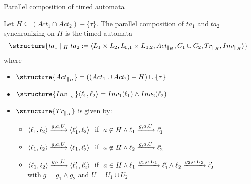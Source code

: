 \documentclass[aspectratio=169]{beamer}
\begin{document}
\begin{slide}{Parallel composition of timed automata}
\small

Let $H \subseteq (Act_1 \cap Act_2) - \{\tau\}$. The parallel composition of $ta_1$ and  $ta_2$ synchronizing on $H$
is the timed automata
\begin{equation*}
\structure{ta_1 \parallel_H ta_2 := \pair{L_1 \times L_2, L_{0,1} \times L_{0,2}, Act_{\parallel_H}, C_1 \cup C_2, Tr_{\parallel_H}, Inv_{\parallel_H}}}
\end{equation*}
where
\begin{itemize}
\item $\structure{Act_{\parallel_H}} = ((Act_1 \cup Act_2) - H) \cup \enset{\tau}$
\item $\structure{Inv_{\parallel_H}} \pair{\ell_1,\ell_2} = Inv_1(\ell_1) \land  Inv_2(\ell_2)$
\item $\structure{Tr_{\parallel_H}}$ is given by:
\begin{itemize}
\item $\langle \ell_1,\ell_2 \rangle \xrightarrow{g,a,U} \langle \ell'_1,\ell_2 \rangle\; $ if $\; a \not \in H \land  \ell_1 \xrightarrow{g,a,U} \ell'_1 $
\item $\langle \ell_1,\ell_2 \rangle \xrightarrow{g,a,U} \langle \ell_1,\ell'_2 \rangle\; $ if $\; a \not \in H \land   \ell_2 \xrightarrow{g,a,U} \ell'_2$
\item $\langle \ell_1,\ell_2 \rangle \xrightarrow{g,\tau,U} \langle \ell'_1,\ell'_2 \rangle\; $ if $\; a \in H \land  \ell_1 \xrightarrow{g_1,a,U_1} \ell'_1 \land \ell_2 \xrightarrow{g_2,a,U_2} \ell'_2$\\
with $g = g_1 \land g_2$ and $U = U_1 \cup U_2$
\end{itemize}
\end{itemize}
\end{slide}
\end{document}

